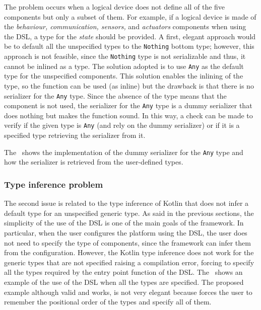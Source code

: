 The problem occurs when a logical device does not define all of the five components but only a subset of them.
For example, if a logical device is made of the \emph{behaviour, communication, sensors,} and \emph{actuators} components when using the DSL, a type
for the \emph{state} should be provided. A first, elegant approach would be to default all the unspecified types to the \texttt{Nothing} bottom type;
however, this approach is not feasible, since the \texttt{Nothing} type is not serializable and thus, it cannot be inlined as a type.
The solution adopted is to use \texttt{Any} as the default type for the unspecified components. This solution enables the inlining of the type,
so the function can be used (as inline) but the drawback is that there is no serializer for the \texttt{Any} type.
Since the absence of the type means that the component is not used, the serializer for the \texttt{Any} type is a dummy serializer that does
nothing but makes the function sound. In this way, a check can be made to verify if the given type is \texttt{Any} (and rely on the dummy serializer)
or if it is a specified type retrieving the serializer from it.

The~ shows the implementation of the dummy serializer for the \texttt{Any} type and how the serializer is retrieved from the
user-defined types.



\subsubsection{Type inference problem}

The second issue is related to the type inference of Kotlin that does not infer a default type for an unspecified generic type.
As said in the previous sections, the simplicity of the use of the DSL is one of the main goals of the framework. In particular, when the user
configures the platform using the DSL, the user does not need to specify the type of components, since the framework can infer them from the
configuration. However, the Kotlin type inference does not work for the generic types that are not specified raising a compilation error, forcing
to specify all the types required by the entry point function of the DSL. The~ shows an example of the use of the
DSL when all the types are specified. The proposed example although valid and works, is not very elegant because forces the user to remember
the positional order of the types and specify all of them.

